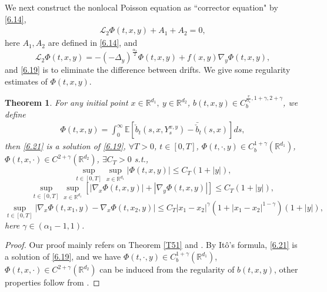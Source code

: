 \documentclass[11pt,reqno]{amsart}
\newtheorem{theorem}{\indent Theorem}[section]
\numberwithin{equation}{section}
\begin{document}
We next construct the nonlocal Poisson equation as   ``corrector equation" by \eqref{6.14},
\begin{equation}\label{6.19}
	\begin{split}
		\mathcal{L}_{2}\Phi(t,x,y)+ A_{1}+A_{2}=0,
	\end{split}
\end{equation}
here $ A_{1}, A_{2}$ are defined in \eqref{6.14}, and
\begin{equation}\label{6.18}
	\mathcal{L}_{2}\Phi(t,x,y)=-(-\Delta_{y})^{\frac{\alpha_{2}}{2}}\Phi(t,x,y)+f(x,y)\nabla_{y}\Phi(t,x,y),
\end{equation}
and \eqref{6.19} is to eliminate the difference between drifts.  We give some regularity estimates of $\Phi(t,x,y)$.




\iffalse
\begin{theorem}\label{T61}
	For any  initial point $x\in\mathbb{R}^{d_{1}},\ y\in\mathbb{R}^{d_{2}}$, $ b(t,x,y)\in C_{b}^{\frac{v}{\alpha_{1}},1+\gamma,2+\gamma}$, we define 
	\begin{equation}\label{6.21}
		\begin{split}
			\Phi(t,x,y)=\int^{\infty}_{0}\mathbb{E}\left[ \check{b}_{t}(s,x,Y_{s}^{x,y})-\bar{\check{b}}_{t}(s,x)\right]ds,
		\end{split}
	\end{equation}
	then \eqref{6.21} is a solution of \eqref{6.19},  $\forall T>0$, $t\in [0,T]$,  $	\Phi(t,\cdot,y)\in C^{1+\gamma}_{b}(\mathbb{R}^{d_{1}})$, $	\Phi(t,x,\cdot)\in C^{2+\gamma}(\mathbb{R}^{ d_{2}})$,  $\exists C_{T}>0$ s.t.,
	\begin{equation}\label{6.23}
		\sup_{t\in [0,T]} \sup_{x\in \mathbb{R}^{d_{1}}}	 |\Phi(t,x,y)| \leq C_{T}(1+|y|),
	\end{equation}
	\begin{equation}\label{6.24}
		\sup_{t\in [0,T]} 	\sup_{x\in \mathbb{R}^{d_{1}}}[|\nabla_{x}\Phi(t,x,y)|+|\nabla_{y}\Phi(t,x,y)|]\leq C_{T}(1+|y|),
	\end{equation}
	\begin{equation}\label{6.25}
		\sup_{t\in [0,T]} |\nabla_{x}\Phi(t,x_{1},y)-\nabla_{x}\Phi(t,x_{2},y)|\leq C_{T}|x_{1}-x_{2}|^{\gamma}(1+|x_{1}-x_{2}|^{1-\gamma})(1+|y|),
	\end{equation}
	here $\gamma\in (\alpha_{1}-1,1)$.
\end{theorem}
\begin{proof}
	Our proof mainly refers on Theorem \ref{T51} and \cite[Proposition 3.3]{SXX} . By It\^{o}'s formula, \eqref{6.21} is a solution of \eqref{6.19}, and we have  $	\Phi(t,\cdot,y)\in C^{1+\gamma}_{b}(\mathbb{R}^{d_{1}})$, $	\Phi(t,x,\cdot)\in C^{2+\gamma}(\mathbb{R}^{ d_{2}})$ can be induced from the regularity of $b(t,x,y)$, other properties follow from \cite{SXX}.
\end{proof}
\end{document}
